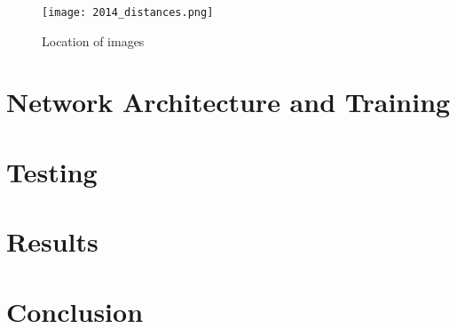\documentclass[pageno]{jpaper}
\begin{document}
\begin{figure}
\caption{Location of images}
\centering
\texttt{[image: 2014\_distances.png]}
\end{figure}

\section{Network Architecture and Training}

\section{Testing}

\section{Results}

\section{Conclusion}

% 
\pagebreak


\end{document}
